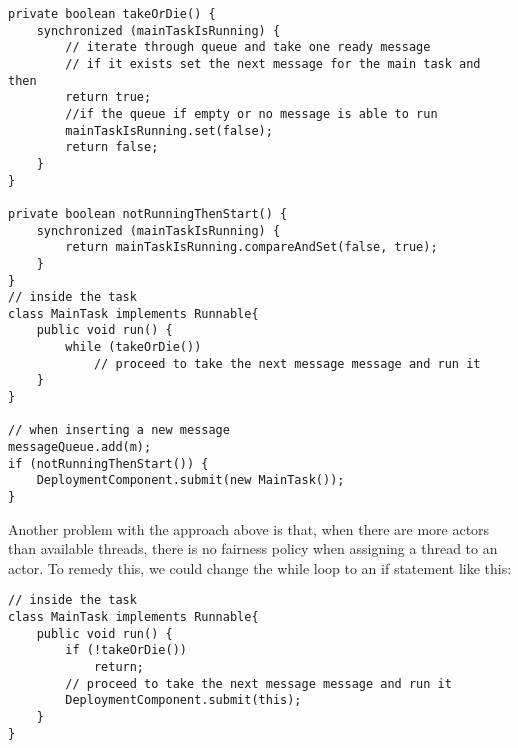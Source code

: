\begin{lstlisting}[caption= Complete Synchronization for the Demand-Driven Approach]
private boolean takeOrDie() {
	synchronized (mainTaskIsRunning) {
		// iterate through queue and take one ready message 
		// if it exists set the next message for the main task and then
		return true;
		//if the queue if empty or no message is able to run
		mainTaskIsRunning.set(false);
		return false;
	}
}

private boolean notRunningThenStart() {
	synchronized (mainTaskIsRunning) {
		return mainTaskIsRunning.compareAndSet(false, true);
	}
}
// inside the task
class MainTask implements Runnable{
	public void run() {
		while (takeOrDie())
			// proceed to take the next message message and run it	 
	}
}

// when inserting a new message
messageQueue.add(m);
if (notRunningThenStart()) {
	DeploymentComponent.submit(new MainTask());
}
\end{lstlisting}

Another problem with the approach above is that, when there are more actors than available threads, there is no fairness policy when assigning a thread to an actor. To remedy this, we could change the while loop to an if statement like this:

\begin{lstlisting}[caption= Fairness Between Actors]
// inside the task
class MainTask implements Runnable{
	public void run() {
		if (!takeOrDie())
			return;
		// proceed to take the next message message and run it	 
		DeploymentComponent.submit(this);
	}
}
\end{lstlisting}





